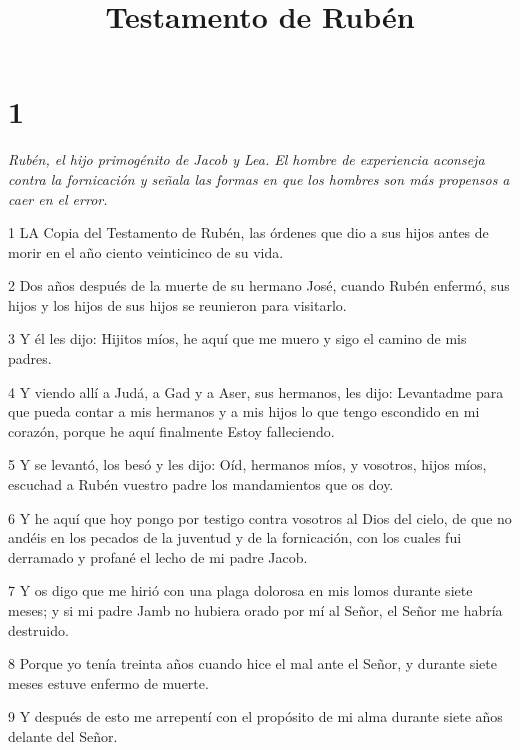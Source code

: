 

\title{Testamento de Rubén}

\chapter{1}

\par \textit{Rubén, el hijo primogénito de Jacob y Lea. El hombre de experiencia aconseja contra la fornicación y señala las formas en que los hombres son más propensos a caer en el error.}

\par 1 LA Copia del Testamento de Rubén, las órdenes que dio a sus hijos antes de morir en el año ciento veinticinco de su vida.

\par 2 Dos años después de la muerte de su hermano José, cuando Rubén enfermó, sus hijos y los hijos de sus hijos se reunieron para visitarlo.

\par 3 Y él les dijo: Hijitos míos, he aquí que me muero y sigo el camino de mis padres.

\par 4 Y viendo allí a Judá, a Gad y a Aser, sus hermanos, les dijo: Levantadme para que pueda contar a mis hermanos y a mis hijos lo que tengo escondido en mi corazón, porque he aquí finalmente Estoy falleciendo.

\par 5 Y se levantó, los besó y les dijo: Oíd, hermanos míos, y vosotros, hijos míos, escuchad a Rubén vuestro padre los mandamientos que os doy.

\par 6 Y he aquí que hoy pongo por testigo contra vosotros al Dios del cielo, de que no andéis en los pecados de la juventud y de la fornicación, con los cuales fui derramado y profané el lecho de mi padre Jacob.

\par 7 Y os digo que me hirió con una plaga dolorosa en mis lomos durante siete meses; y si mi padre Jamb no hubiera orado por mí al Señor, el Señor me habría destruido.

\par 8 Porque yo tenía treinta años cuando hice el mal ante el Señor, y durante siete meses estuve enfermo de muerte.

\par 9 Y después de esto me arrepentí con el propósito de mi alma durante siete años delante del Señor.

